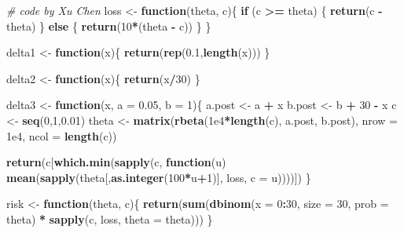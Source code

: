 \documentclass[
]{article}
\newenvironment{Shaded}{\begin{snugshade}}{\end{snugshade}}
\newcommand{\CommentTok}[1]{\textcolor[rgb]{0.56,0.35,0.01}{\textit{#1}}}
\newcommand{\ControlFlowTok}[1]{\textcolor[rgb]{0.13,0.29,0.53}{\textbf{#1}}}
\newcommand{\DataTypeTok}[1]{\textcolor[rgb]{0.13,0.29,0.53}{#1}}
\newcommand{\DecValTok}[1]{\textcolor[rgb]{0.00,0.00,0.81}{#1}}
\newcommand{\FloatTok}[1]{\textcolor[rgb]{0.00,0.00,0.81}{#1}}
\newcommand{\KeywordTok}[1]{\textcolor[rgb]{0.13,0.29,0.53}{\textbf{#1}}}
\newcommand{\NormalTok}[1]{#1}
\newcommand{\OperatorTok}[1]{\textcolor[rgb]{0.81,0.36,0.00}{\textbf{#1}}}
\newcommand{\StringTok}[1]{\textcolor[rgb]{0.31,0.60,0.02}{#1}}
\begin{document}
\begin{Shaded}
\begin{Highlighting}[]
\CommentTok{# code by Xu Chen}
\NormalTok{loss <-}\StringTok{ }\ControlFlowTok{function}\NormalTok{(theta, c)\{}
  \ControlFlowTok{if}\NormalTok{ (c }\OperatorTok{>=}\StringTok{ }\NormalTok{theta) \{}
    \KeywordTok{return}\NormalTok{(c }\OperatorTok{-}\StringTok{ }\NormalTok{theta)}
\NormalTok{  \} }\ControlFlowTok{else}\NormalTok{ \{}
    \KeywordTok{return}\NormalTok{(}\DecValTok{10}\OperatorTok{*}\NormalTok{(theta }\OperatorTok{-}\StringTok{ }\NormalTok{c))}
\NormalTok{  \}}
\NormalTok{\}}


\NormalTok{delta1 <-}\StringTok{ }\ControlFlowTok{function}\NormalTok{(x)\{}
  \KeywordTok{return}\NormalTok{(}\KeywordTok{rep}\NormalTok{(}\FloatTok{0.1}\NormalTok{,}\KeywordTok{length}\NormalTok{(x)))}
\NormalTok{\}}


\NormalTok{delta2 <-}\StringTok{ }\ControlFlowTok{function}\NormalTok{(x)\{}
  \KeywordTok{return}\NormalTok{(x}\OperatorTok{/}\DecValTok{30}\NormalTok{)}
\NormalTok{\}}


\NormalTok{delta3 <-}\StringTok{ }\ControlFlowTok{function}\NormalTok{(x, }\DataTypeTok{a =} \FloatTok{0.05}\NormalTok{, }\DataTypeTok{b =} \DecValTok{1}\NormalTok{)\{}
\NormalTok{  a.post <-}\StringTok{ }\NormalTok{a }\OperatorTok{+}\StringTok{ }\NormalTok{x}
\NormalTok{  b.post <-}\StringTok{ }\NormalTok{b }\OperatorTok{+}\StringTok{ }\DecValTok{30} \OperatorTok{-}\StringTok{ }\NormalTok{x}
\NormalTok{  c <-}\StringTok{ }\KeywordTok{seq}\NormalTok{(}\DecValTok{0}\NormalTok{,}\DecValTok{1}\NormalTok{,}\FloatTok{0.01}\NormalTok{)}
\NormalTok{  theta <-}\StringTok{ }\KeywordTok{matrix}\NormalTok{(}\KeywordTok{rbeta}\NormalTok{(}\FloatTok{1e4}\OperatorTok{*}\KeywordTok{length}\NormalTok{(c), a.post, b.post), }\DataTypeTok{nrow =} \FloatTok{1e4}\NormalTok{, }\DataTypeTok{ncol =} \KeywordTok{length}\NormalTok{(c))}
  
  \KeywordTok{return}\NormalTok{(c[}\KeywordTok{which.min}\NormalTok{(}\KeywordTok{sapply}\NormalTok{(c, }\ControlFlowTok{function}\NormalTok{(u) }\KeywordTok{mean}\NormalTok{(}\KeywordTok{sapply}\NormalTok{(theta[,}\KeywordTok{as.integer}\NormalTok{(}\DecValTok{100}\OperatorTok{*}\NormalTok{u}\OperatorTok{+}\DecValTok{1}\NormalTok{)], loss, }\DataTypeTok{c =}\NormalTok{ u))))])}
\NormalTok{\}}

\NormalTok{risk <-}\StringTok{ }\ControlFlowTok{function}\NormalTok{(theta, c)\{}
  \KeywordTok{return}\NormalTok{(}\KeywordTok{sum}\NormalTok{(}\KeywordTok{dbinom}\NormalTok{(}\DataTypeTok{x =} \DecValTok{0}\OperatorTok{:}\DecValTok{30}\NormalTok{, }\DataTypeTok{size =} \DecValTok{30}\NormalTok{, }\DataTypeTok{prob =}\NormalTok{ theta) }\OperatorTok{*}\StringTok{ }\KeywordTok{sapply}\NormalTok{(c, loss, }\DataTypeTok{theta =}\NormalTok{ theta)))}
\NormalTok{\}}



\end{Highlighting}
\end{Shaded}
\end{document}
